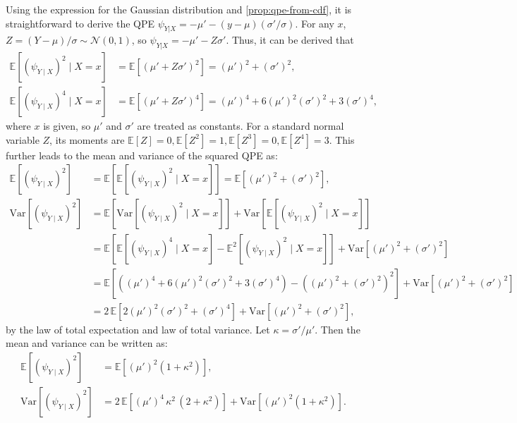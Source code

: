 \documentclass{article}
\theoremstyle{plain}
\theoremstyle{definition}
\theoremstyle{remark}
\begin{document}
Using the expression for the Gaussian distribution and \cref{prop:qpe-from-cdf}, it is straightforward to derive the QPE $\psi_{Y|X}=-\mu'-(y-\mu)(\sigma'/\sigma)$. For any $x$, $Z=(Y-\mu)/\sigma\sim\mathcal{N}(0,1)$, so $\psi_{Y|X}=-\mu'-Z\sigma'$. Thus, it can be derived that
\[\begin{aligned}\mathbb{E}\left[(\psi_{Y\mid X})^2\!\mid\!X=x\right]&=\mathbb{E}\left[(\mu'+Z\sigma')^2\right]=(\mu')^2+(\sigma')^2,\\\mathbb{E}\left[(\psi_{Y\mid X})^4\!\mid\!X=x\right]&=\mathbb{E}\left[(\mu'+Z\sigma')^4\right]=(\mu')^4+6(\mu')^2(\sigma')^2+3(\sigma')^4,\end{aligned}\]
where $x$ is given, so $\mu'$ and $\sigma'$ are treated as constants. For a standard normal variable $Z$, its moments are $\mathbb{E}\left[Z\right]=0,\mathbb{E}\left[Z^2\right]=1,\mathbb{E}\left[Z^3\right]=0,\mathbb{E}\left[Z^4\right]=3$. This further leads to the mean and variance of the squared QPE as:
\[\begin{aligned}\mathbb{E}\left[(\psi_{Y\mid X})^2\right]&=\mathbb{E}\left[\mathbb{E}\left[(\psi_{Y\mid X})^2\!\mid\!X=x\right]\right]=\mathbb{E}\left[(\mu')^2+(\sigma')^2\right],\\\text{Var}\left[(\psi_{Y\mid X})^2\right]&=\mathbb{E}\left[\text{Var}\left[(\psi_{Y\mid X})^2\!\mid\!X=x\right]\right]+\text{Var}\left[\mathbb{E}\left[(\psi_{Y\mid X})^2\!\mid\!X=x\right]\right]\\&=\mathbb{E}\left[\mathbb{E}\left[(\psi_{Y\mid X})^4\!\mid\!X=x\right]-\mathbb{E}^2\left[(\psi_{Y\mid X})^2\!\mid\!X=x\right]\right]+\text{Var}\left[(\mu')^2+(\sigma')^2\right]\\&=\mathbb{E}\left[((\mu')^4+6(\mu')^2(\sigma')^2+3(\sigma')^4)-((\mu')^2+(\sigma')^2)^2\right]+\text{Var}\left[(\mu')^2+(\sigma')^2\right]\\&=2\,\mathbb{E}\left[2(\mu')^2(\sigma')^2+(\sigma')^4\right]+\text{Var}\left[(\mu')^2+(\sigma')^2\right],\end{aligned}\]
by the law of total expectation and law of total variance. Let $\kappa=\sigma'/\mu'$. Then the mean and variance can be written as:
\[\begin{aligned}\mathbb{E}\left[(\psi_{Y\mid X})^2\right]&=\mathbb{E}\left[(\mu')^2(1+\kappa^2)\right],\\\text{Var}\left[(\psi_{Y\mid X})^2\right]&=2\,\mathbb{E}\left[(\mu')^4\,\kappa^2\,(2+\kappa^2)\right]+\text{Var}\left[(\mu')^2(1+\kappa^2)\right].\end{aligned}\]
\end{document}
